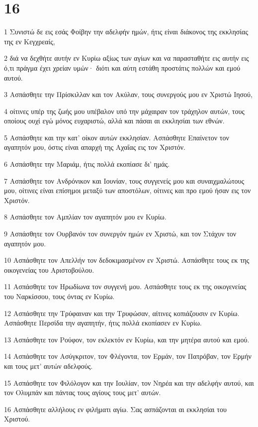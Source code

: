 \chapter{16}

\par 1 Συνιστώ δε εις εσάς Φοίβην την αδελφήν ημών, ήτις είναι διάκονος της εκκλησίας της εν Κεγχρεαίς,
\par 2 διά να δεχθήτε αυτήν εν Κυρίω αξίως των αγίων και να παρασταθήτε εις αυτήν εις ό,τι πράγμα έχει χρείαν υμών· διότι και αύτη εστάθη προστάτις πολλών και εμού αυτού.
\par 3 Ασπάσθητε την Πρίσκιλλαν και τον Ακύλαν, τους συνεργούς μου εν Χριστώ Ιησού,
\par 4 οίτινες υπέρ της ζωής μου υπέβαλον υπό την μάχαιραν τον τράχηλον αυτών, τους οποίους ουχί εγώ μόνος ευχαριστώ, αλλά και πάσαι αι εκκλησίαι των εθνών.
\par 5 Ασπάσθητε και την κατ' οίκον αυτών εκκλησίαν. Ασπάσθητε Επαίνετον τον αγαπητόν μου, όστις είναι απαρχή της Αχαΐας εις τον Χριστόν.
\par 6 Ασπάσθητε την Μαριάμ, ήτις πολλά εκοπίασε δι' ημάς.
\par 7 Ασπάσθητε τον Ανδρόνικον και Ιουνίαν, τους συγγενείς μου και συναιχμαλώτους μου, οίτινες είναι επίσημοι μεταξύ των αποστόλων, οίτινες και προ εμού ήσαν εις τον Χριστόν.
\par 8 Ασπάσθητε τον Αμπλίαν τον αγαπητόν μου εν Κυρίω.
\par 9 Ασπάσθητε τον Ουρβανόν τον συνεργόν ημών εν Χριστώ, και τον Στάχυν τον αγαπητόν μου.
\par 10 Ασπάσθητε τον Απελλήν τον δεδοκιμασμένον εν Χριστώ. Ασπάσθητε τους εκ της οικογενείας του Αριστοβούλου.
\par 11 Ασπάσθητε τον Ηρωδίωνα τον συγγενή μου. Ασπάσθητε τους εκ της οικογενείας του Ναρκίσσου, τους όντας εν Κυρίω.
\par 12 Ασπάσθητε την Τρύφαιναν και την Τρυφώσαν, αίτινες κοπιάζουσιν εν Κυρίω. Ασπάσθητε Περσίδα την αγαπητήν, ήτις πολλά εκοπίασεν εν Κυρίω.
\par 13 Ασπάσθητε τον Ρούφον, τον εκλεκτόν εν Κυρίω, και την μητέρα αυτού και εμού.
\par 14 Ασπάσθητε τον Ασύγκριτον, τον Φλέγοντα, τον Ερμάν, τον Πατρόβαν, τον Ερμήν και τους μετ' αυτών αδελφούς.
\par 15 Ασπάσθητε τον Φιλόλογον και την Ιουλίαν, τον Νηρέα και την αδελφήν αυτού, και τον Ολυμπάν και πάντας τους αγίους τους μετ' αυτών.
\par 16 Ασπάσθητε αλλήλους εν φιλήματι αγίω. Σας ασπάζονται αι εκκλησίαι του Χριστού.
